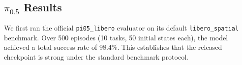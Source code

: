 \documentclass{article}
\begin{document}
\subsection{$\pi_{0.5}$ Results}

We first ran the official \texttt{pi05\_libero} evaluator on its default \texttt{libero\_spatial} benchmark. Over 500 episodes (10 tasks, 50 initial states each), the model achieved a total success rate of 98.4\%. This establishes that the released checkpoint is strong under the standard benchmark protocol.

\end{document}
